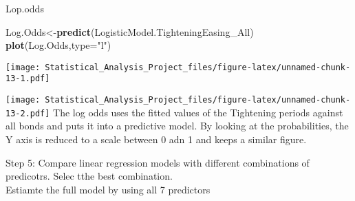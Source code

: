 \documentclass[]{article}
\newenvironment{Shaded}{\begin{snugshade}}{\end{snugshade}}
\newcommand{\KeywordTok}[1]{\textcolor[rgb]{0.13,0.29,0.53}{\textbf{#1}}}
\newcommand{\DataTypeTok}[1]{\textcolor[rgb]{0.13,0.29,0.53}{#1}}
\newcommand{\DecValTok}[1]{\textcolor[rgb]{0.00,0.00,0.81}{#1}}
\newcommand{\StringTok}[1]{\textcolor[rgb]{0.31,0.60,0.02}{#1}}
\newcommand{\OperatorTok}[1]{\textcolor[rgb]{0.81,0.36,0.00}{\textbf{#1}}}
\newcommand{\NormalTok}[1]{#1}
\begin{document}
Lop.odds

\begin{Shaded}
\begin{Highlighting}[]
\NormalTok{Log.Odds<-}\KeywordTok{predict}\NormalTok{(LogisticModel.TighteningEasing_All)}
\KeywordTok{plot}\NormalTok{(Log.Odds,}\DataTypeTok{type=}\StringTok{"l"}\NormalTok{)}
\end{Highlighting}
\end{Shaded}

\texttt{[image: Statistical\_Analysis\_Project\_files/figure-latex/unnamed-chunk-13-1.pdf]}

\begin{Shaded}
\end{Shaded}

\texttt{[image: Statistical\_Analysis\_Project\_files/figure-latex/unnamed-chunk-13-2.pdf]}
The log odds uses the fitted values of the Tightening periods against
all bonds and puts it into a predictive model. By looking at the
probabilities, the Y axis is reduced to a scale between 0 adn 1 and
keeps a similar figure.

Step 5: Compare linear regression models with different combinations of
predicotrs. Selec tthe best combination.\\
Estiamte the full model by using all 7 predictors

\begin{Shaded}
\end{Shaded}
\end{document}

